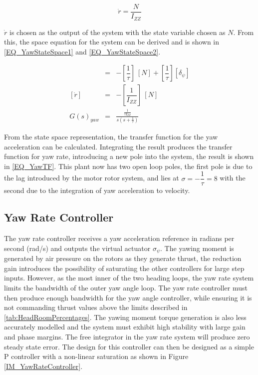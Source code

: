 \documentclass[12pt]{report}
\begin{document}
\begin{equation}
\label{EQ_YawNewton}
\dot{r} = \dfrac{N}{I_{ZZ}}
\end{equation}

$\dot{r}$ is chosen as the output of the system with the state variable chosen as $N$. From this, the space equation for the system can be derived and is shown in \eqref{EQ_YawStateSpace1} and \eqref{EQ_YawStateSpace2}. 

\begin{eqnarray}
[\dot{N}] &=& - [\dfrac{1}{\tau}] \ [N] + [\dfrac{1}{\tau}] [\delta_\psi]\label{EQ_YawStateSpace1}\\\label{EQ_HeaveStateSpace22}
[\dot{r}] &=& - [\dfrac{1}{I_{ZZ}}] \ [N]\label{EQ_YawStateSpace2}\\
G(s)_{yaw} &=& \frac{\frac{1}{\tau I_{ZZ}}}{s (s + \frac{1}{\tau})}\label{EQ_YawTF}
\end{eqnarray}

From the state space representation, the transfer function for the yaw acceleration can be calculated. Integrating the result produces the transfer function for yaw rate, introducing a new pole into the system, the result is shown in \eqref{EQ_YawTF}. This plant now has two open loop poles, the first pole is due to the lag introduced by the motor rotor system, and lies at $\sigma = -\dfrac{1}{\tau} = 8$ with the second due to the integration of yaw acceleration to velocity. 

\subsection{Yaw Rate Controller}	
The yaw rate controller receives a yaw acceleration reference in radians per second (rad/s) and outputs the virtual actuator $\sigma_{\psi}$. The yawing moment is generated by air pressure on the rotors as they generate thrust, the reduction gain introduces the possibility of saturating the other controllers for large step inputs. However, as the most inner of the two heading loops, the yaw rate system limits the bandwidth of the outer yaw angle loop. The yaw rate controller must then produce enough bandwidth for the yaw angle controller, while ensuring it is not commanding thrust values above the limits described in \ref{tab:HeadRoomPercentages}. The yawing moment torque generation is also less accurately modelled  and the system must exhibit high stability with large gain and phase margins. The free integrator in the yaw rate system will produce zero steady state error. The design for this controller can then be designed as a simple P controller with a non-linear saturation as shown in Figure \ref{IM_YawRateController}.
\end{document}
